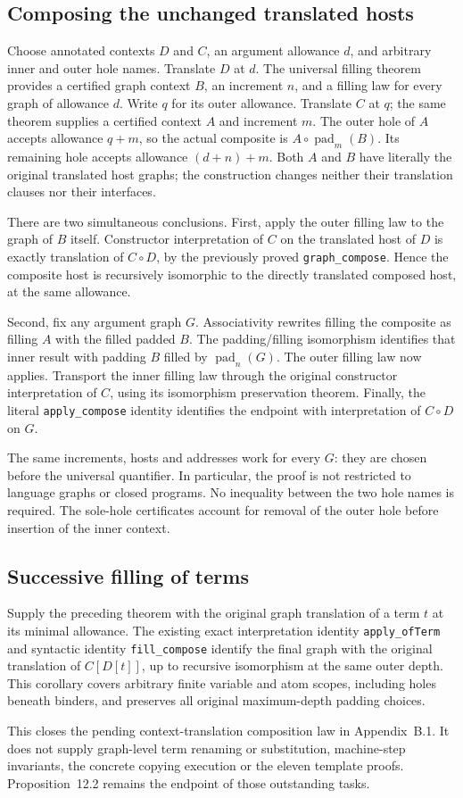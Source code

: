 \subsection{Composing the unchanged translated hosts}
Choose annotated contexts $D$ and $C$, an argument allowance $d$, and arbitrary
inner and outer hole names. Translate $D$ at $d$. The universal filling theorem
provides a certified graph context $B$, an increment $n$, and a filling law
for every graph of allowance $d$. Write $q$ for its outer allowance. Translate
$C$ at $q$; the same theorem supplies a certified context $A$ and increment
$m$. The outer hole of $A$ accepts allowance $q+m$, so the actual composite
is $A\circ\operatorname{pad}_m(B)$. Its remaining hole accepts allowance
$(d+n)+m$. Both $A$ and $B$ have literally the original translated host graphs;
the construction changes neither their translation clauses nor their interfaces.

There are two simultaneous conclusions. First, apply the outer filling law to
the graph of $B$ itself. Constructor interpretation of $C$ on the translated
host of $D$ is exactly translation of $C\circ D$, by the previously proved
\texttt{graph\_compose}. Hence the composite host is recursively isomorphic
to the directly translated composed host, at the same allowance.

Second, fix any argument graph $G$. Associativity rewrites filling the
composite as filling $A$ with the filled padded $B$. The padding/filling
isomorphism identifies that inner result with padding $B$ filled by
$\operatorname{pad}_n(G)$. The outer filling law now applies. Transport the
inner filling law through the original constructor interpretation of $C$,
using its isomorphism preservation theorem. Finally, the literal
\texttt{apply\_compose} identity identifies the endpoint with interpretation
of $C\circ D$ on $G$.

The same increments, hosts and addresses work for every $G$: they are chosen
before the universal quantifier. In particular, the proof is not restricted
to language graphs or closed programs. No inequality between the two hole
names is required. The sole-hole certificates account for removal of the
outer hole before insertion of the inner context.

\subsection{Successive filling of terms}
Supply the preceding theorem with the original graph translation of a term
$t$ at its minimal allowance. The existing exact interpretation identity
\texttt{apply\_ofTerm} and syntactic identity \texttt{fill\_compose} identify
the final graph with the original translation of $C[D[t]]$, up to recursive
isomorphism at the same outer depth. This corollary covers arbitrary finite
variable and atom scopes, including holes beneath binders, and preserves all
original maximum-depth padding choices.

This closes the pending context-translation composition law in Appendix~B.1.
It does not supply graph-level term renaming or substitution, machine-step
invariants, the concrete copying execution or the eleven template proofs.
Proposition~12.2 remains the endpoint of those outstanding tasks.
